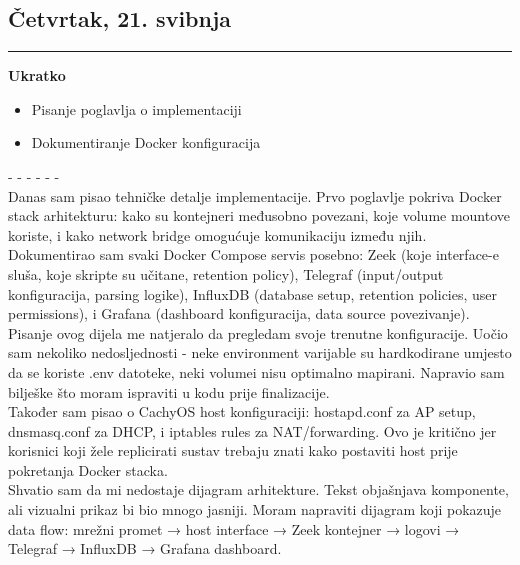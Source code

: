 \documentclass[12pt, a4paper]{article}
\newcommand{\dan}[1]{
    \subsection*{#1}
    \vspace{-0.5em} 
    \hrule \vspace{0.5em} 
}
\begin{document}
\dan{Četvrtak, 21. svibnja}
\textbf{Ukratko}
\begin{itemize}
    \item Pisanje poglavlja o implementaciji
    \item Dokumentiranje Docker konfiguracija
\end{itemize}
- - - - - - \\
Danas sam pisao tehničke detalje implementacije. Prvo poglavlje pokriva Docker stack arhitekturu: kako su kontejneri međusobno povezani, koje volume mountove koriste, i kako network bridge omogućuje komunikaciju između njih.
\\
Dokumentirao sam svaki Docker Compose servis posebno: Zeek (koje interface-e sluša, koje skripte su učitane, retention policy), Telegraf (input/output konfiguracija, parsing logike), InfluxDB (database setup, retention policies, user permissions), i Grafana (dashboard konfiguracija, data source povezivanje).
\\
Pisanje ovog dijela me natjeralo da pregledam svoje trenutne konfiguracije. Uočio sam nekoliko nedosljednosti - neke environment varijable su hardkodirane umjesto da se koriste .env datoteke, neki volumei nisu optimalno mapirani. Napravio sam bilješke što moram ispraviti u kodu prije finalizacije.
\\
Također sam pisao o CachyOS host konfiguraciji: hostapd.conf za AP setup, dnsmasq.conf za DHCP, i iptables rules za NAT/forwarding. Ovo je kritično jer korisnici koji žele replicirati sustav trebaju znati kako postaviti host prije pokretanja Docker stacka.
\\
Shvatio sam da mi nedostaje dijagram arhitekture. Tekst objašnjava komponente, ali vizualni prikaz bi bio mnogo jasniji. Moram napraviti dijagram koji pokazuje data flow: mrežni promet → host interface → Zeek kontejner → logovi → Telegraf → InfluxDB → Grafana dashboard.
\end{document}
